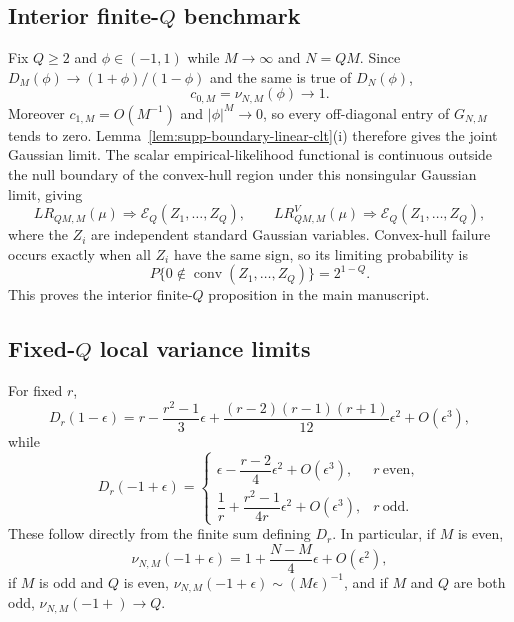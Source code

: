 \documentclass[12pt]{article}
\theoremstyle{remark}
\begin{document}
\subsection{Interior finite-$Q$ benchmark}
Fix $Q\ge2$ and $\phi\in(-1,1)$ while $M\to\infty$ and $N=QM$. Since $D_M(\phi)\to(1+\phi)/(1-\phi)$ and the same is true of $D_N(\phi)$,
\[
c_{0,M}=\nu_{N,M}(\phi)\longrightarrow1.
\]
Moreover $c_{1,M}=O(M^{-1})$ and $|\phi|^M\to0$, so every off-diagonal entry of $G_{N,M}$ tends to zero. Lemma~\ref{lem:supp-boundary-linear-clt}(i) therefore gives the joint Gaussian limit. The scalar empirical-likelihood functional is continuous outside the null boundary of the convex-hull region under this nonsingular Gaussian limit, giving
\begin{equation}
LR_{QM,M}(\mu)\Rightarrow\mathcal E_Q(Z_1,\ldots,Z_Q),
\qquad
LR^V_{QM,M}(\mu)\Rightarrow\mathcal E_Q(Z_1,\ldots,Z_Q),
\label{eq:supp-interior-fixedQ}
\end{equation}
where the $Z_i$ are independent standard Gaussian variables. Convex-hull failure occurs exactly when all $Z_i$ have the same sign, so its limiting probability is
\begin{equation*}
P\{0\notin\operatorname{conv}(Z_1,\ldots,Z_Q)\}=2^{1-Q}.
\end{equation*}
This proves the interior finite-$Q$ proposition in the main manuscript.

\subsection{Fixed-$Q$ local variance limits}
For fixed $r$,
\begin{equation*}
D_r(1-\epsilon)
=r-\frac{r^2-1}{3}\epsilon
+\frac{(r-2)(r-1)(r+1)}{12}\epsilon^2+O(\epsilon^3),
\end{equation*}
while
\begin{equation*}
D_r(-1+\epsilon)
=\begin{cases}
\epsilon-\dfrac{r-2}{4}\epsilon^2+O(\epsilon^3),&r\ \text{even},\\[1ex]
\dfrac1r+\dfrac{r^2-1}{4r}\epsilon^2+O(\epsilon^3),&r\ \text{odd}.
\end{cases}
\end{equation*}
These follow directly from the finite sum defining $D_r$. In particular, if $M$ is even,
\[
\nu_{N,M}(-1+\epsilon)=1+\frac{N-M}{4}\epsilon+O(\epsilon^2),
\]
if $M$ is odd and $Q$ is even, $\nu_{N,M}(-1+\epsilon)\sim(M\epsilon)^{-1}$, and if $M$ and $Q$ are both odd, $\nu_{N,M}(-1+)\to Q$.
\end{document}
